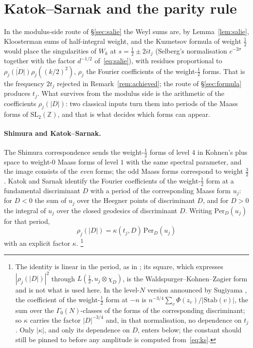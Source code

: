 \documentclass[11pt,a4paper]{article}
\theoremstyle{remark}\newtheorem{remark}[theorem]{Remark}
\newcommand{\Z}{\mathbb Z}\newcommand{\R}{\mathbb R}\newcommand{\Q}{\mathbb Q}\newcommand{\C}{\mathbb C}
\begin{document}
\section{Katok--Sarnak and the parity rule}\label{sec:ks}

In the modulus-side route of \S\ref{sec:salie} the Weyl sums are, by Lemma~\ref{lem:salie}, Kloosterman sums of
half-integral weight, and the Kuznetsov formula of weight $\tfrac12$ would place the singularities of $W_k$ at
$s=\tfrac12\pm2it_j$ (Selberg's normalisation $c^{-2\sigma}$ together with the factor $d^{-1/2}$ of~\eqref{eq:salie}),
with residues proportional to $\overline{\rho_j(|D|)}\rho_j((k/2)^2)$, $\rho_j$ the Fourier coefficients of the
weight-$\tfrac12$ forms. That is the frequency $2t_j$ rejected in Remark~\ref{rem:achieved}; the route of
\S\ref{sec:formula} produces $t_j$. What survives from the modulus side is the arithmetic of the coefficients
$\rho_j(|D|)$: two classical inputs turn them into periods of the Maass forms of $\mathrm{SL}_2(\Z)$, and that is
what decides which forms can appear.

\paragraph{Shimura and Katok--Sarnak.} The Shimura correspondence sends the weight-$\tfrac12$ forms of level $4$ in
Kohnen's plus space to weight-$0$ Maass forms of level $1$ with the same spectral parameter, and the image consists of
the \emph{even} forms; the odd Maass forms correspond to weight $\tfrac32$. Katok and Sarnak
\cite{KatokSarnak1993} identify the Fourier coefficients of the weight-$\tfrac12$ form at a fundamental discriminant
$D$ with a period of the corresponding Maass form $u_j$: for $D<0$ the sum of $u_j$ over the Heegner points of
discriminant $D$, and for $D>0$ the integral of $u_j$ over the closed geodesics of discriminant $D$. Writing
$\mathrm{Per}_D(u_j)$ for that period,
\begin{equation}\label{eq:ks}
\rho_j(|D|)=\kappa(t_j,D)\,\mathrm{Per}_D(u_j)
\end{equation}
with an explicit factor $\kappa$. \footnote{The identity is linear in the period, as in \cite{KatokSarnak1993}; its square, which expresses
$|\rho_j(|D|)|^2$ through $L(\tfrac12,u_j\otimes\chi_D)$, is the Waldspurger--Kohnen--Zagier form and is not what is
used here. In the level-$N$ version announced by Sugiyama \cite{Sugiyama2021}, the coefficient of the weight-$\tfrac12$
form at $-n$ is $n^{-3/4}\sum_v\Phi(z_v)/|\mathrm{Stab}(v)|$, the sum over the $\Gamma_0(N)$-classes of the forms of the
corresponding discriminant; so $\kappa$ carries the factor $|D|^{-3/4}$ and, in that normalisation, no dependence on
$t_j$. Only $|\kappa|$, and only its dependence on $D$, enters below; the constant should still be pinned to
\cite{KatokSarnak1993} before any amplitude is computed from~\eqref{eq:ks}.}
\end{document}
